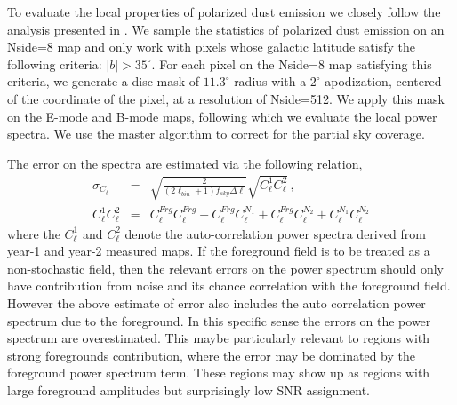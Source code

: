 \documentclass[12pt]{article}
\begin{document}
To evaluate the local properties of polarized dust emission we closely follow the analysis presented in \cite{pip-xxx}. We sample the statistics of polarized dust emission on an Nside=8 map and only work with pixels whose galactic latitude satisfy the following criteria: $|b|>35^{\circ}$. For each pixel on the Nside=8 map satisfying this criteria, we generate a disc mask of $11.3^{\circ}$ radius with a $2^{\circ}$ apodization, centered of the coordinate of the pixel, at a resolution of Nside=512. We apply this mask on the E-mode and B-mode maps, following which we evaluate the local power spectra. We use the master algorithm to correct for the partial sky coverage. 

The error on the spectra are estimated via the following relation,
\begin{eqnarray}
\sigma_{C_{\ell}}&=&\sqrt{\frac{2}{(2\ell_{bin}+1) f_{sky} \Delta \ell}} \sqrt{C^{1}_{\ell} C^{2}_{\ell}}\,, \\
C^{1}_{\ell} C^{2}_{\ell} &=& C^{Frg}_{\ell} C^{Frg}_{\ell} + C^{Frg}_{\ell} C^{N_1}_{\ell} + C^{Frg}_{\ell} C^{N_2}_{\ell} + C^{N_1}_{\ell} C^{N_2}_{\ell}
\end{eqnarray}
where the $C_{\ell}^1$ and $C_{\ell}^2$ denote the auto-correlation power spectra derived from year-1 and year-2 measured maps. If the foreground field is to be treated as a non-stochastic field, then the relevant errors on the power spectrum should only have contribution from noise and its chance correlation with the foreground field. However the above estimate of error also includes the auto correlation power spectrum due to the foreground. In this specific sense the errors on the power spectrum are overestimated. This maybe particularly relevant to regions with strong foregrounds contribution, where the error may be dominated by the foreground power spectrum term. These regions may show up as regions with large foreground amplitudes but surprisingly low SNR assignment.
\end{document}
